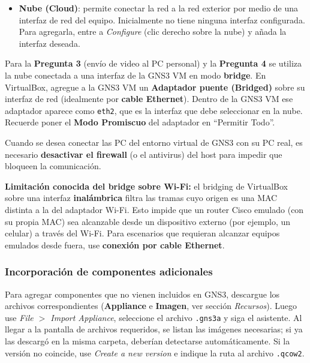 \documentclass[letterpaper,12pt]{article}
\begin{document}
\begin{itemize}
    \item \textbf{Nube (Cloud)}: permite conectar la red a la red exterior por medio de una interfaz de red del equipo. Inicialmente no tiene ninguna interfaz configurada. Para agregarla, entre a \textit{Configure} (clic derecho sobre la nube) y añada la interfaz deseada.
\end{itemize}

\begin{nota}
Para la \textbf{Pregunta 3} (envío de video al PC personal) y la \textbf{Pregunta 4} se utiliza la nube conectada a una interfaz de la GNS3 VM en modo \textbf{bridge}. En VirtualBox, agregue a la GNS3 VM un \textbf{Adaptador puente (Bridged)} sobre su interfaz de red (idealmente por \textbf{cable Ethernet}). Dentro de la GNS3 VM ese adaptador aparece como \texttt{eth2}, que es la interfaz que debe seleccionar en la nube. Recuerde poner el \textbf{Modo Promiscuo} del adaptador en ``Permitir Todo''.
\end{nota}

\begin{nota}
Cuando se desea conectar las PC del entorno virtual de GNS3 con su PC real, es necesario \textbf{desactivar el firewall} (o el antivirus) del host para impedir que bloqueen la comunicación.
\end{nota}

\begin{nota}
\textbf{Limitación conocida del bridge sobre Wi-Fi:} el bridging de VirtualBox sobre una interfaz \textbf{inalámbrica} filtra las tramas cuyo origen es una MAC distinta a la del adaptador Wi-Fi. Esto impide que un router Cisco emulado (con su propia MAC) sea alcanzable desde un dispositivo externo (por ejemplo, un celular) a través del Wi-Fi. Para escenarios que requieran alcanzar equipos emulados desde fuera, use \textbf{conexión por cable Ethernet}.
\end{nota}

\subsubsection{Incorporación de componentes adicionales}

Para agregar componentes que no vienen incluidos en GNS3, descargue los archivos correspondientes (\textbf{Appliance} e \textbf{Imagen}, ver sección \textit{Recursos}). Luego use \textit{File $>$ Import Appliance}, seleccione el archivo \texttt{.gns3a} y siga el asistente. Al llegar a la pantalla de archivos requeridos, se listan las imágenes necesarias; si ya las descargó en la misma carpeta, deberían detectarse automáticamente. Si la versión no coincide, use \textit{Create a new version} e indique la ruta al archivo \texttt{.qcow2}.
\end{document}
